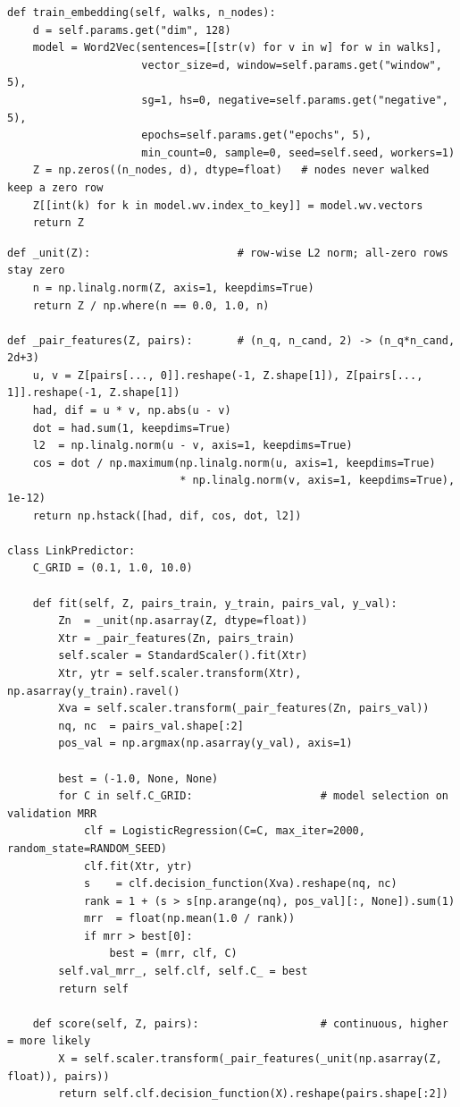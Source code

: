 \begin{lstlisting}[caption={TODO 2 --- \texttt{train\_embedding}},captionpos=b]
def train_embedding(self, walks, n_nodes):
    d = self.params.get("dim", 128)
    model = Word2Vec(sentences=[[str(v) for v in w] for w in walks],
                     vector_size=d, window=self.params.get("window", 5),
                     sg=1, hs=0, negative=self.params.get("negative", 5),
                     epochs=self.params.get("epochs", 5),
                     min_count=0, sample=0, seed=self.seed, workers=1)
    Z = np.zeros((n_nodes, d), dtype=float)   # nodes never walked keep a zero row
    Z[[int(k) for k in model.wv.index_to_key]] = model.wv.vectors
    return Z
\end{lstlisting}

\begin{lstlisting}[caption={TODO 3a --- \texttt{LinkPredictor} (and the pair feature map)},captionpos=b]
def _unit(Z):                       # row-wise L2 norm; all-zero rows stay zero
    n = np.linalg.norm(Z, axis=1, keepdims=True)
    return Z / np.where(n == 0.0, 1.0, n)

def _pair_features(Z, pairs):       # (n_q, n_cand, 2) -> (n_q*n_cand, 2d+3)
    u, v = Z[pairs[..., 0]].reshape(-1, Z.shape[1]), Z[pairs[..., 1]].reshape(-1, Z.shape[1])
    had, dif = u * v, np.abs(u - v)
    dot = had.sum(1, keepdims=True)
    l2  = np.linalg.norm(u - v, axis=1, keepdims=True)
    cos = dot / np.maximum(np.linalg.norm(u, axis=1, keepdims=True)
                           * np.linalg.norm(v, axis=1, keepdims=True), 1e-12)
    return np.hstack([had, dif, cos, dot, l2])

class LinkPredictor:
    C_GRID = (0.1, 1.0, 10.0)

    def fit(self, Z, pairs_train, y_train, pairs_val, y_val):
        Zn  = _unit(np.asarray(Z, dtype=float))
        Xtr = _pair_features(Zn, pairs_train)
        self.scaler = StandardScaler().fit(Xtr)
        Xtr, ytr = self.scaler.transform(Xtr), np.asarray(y_train).ravel()
        Xva = self.scaler.transform(_pair_features(Zn, pairs_val))
        nq, nc  = pairs_val.shape[:2]
        pos_val = np.argmax(np.asarray(y_val), axis=1)

        best = (-1.0, None, None)
        for C in self.C_GRID:                    # model selection on validation MRR
            clf = LogisticRegression(C=C, max_iter=2000, random_state=RANDOM_SEED)
            clf.fit(Xtr, ytr)
            s    = clf.decision_function(Xva).reshape(nq, nc)
            rank = 1 + (s > s[np.arange(nq), pos_val][:, None]).sum(1)
            mrr  = float(np.mean(1.0 / rank))
            if mrr > best[0]:
                best = (mrr, clf, C)
        self.val_mrr_, self.clf, self.C_ = best
        return self

    def score(self, Z, pairs):                   # continuous, higher = more likely
        X = self.scaler.transform(_pair_features(_unit(np.asarray(Z, float)), pairs))
        return self.clf.decision_function(X).reshape(pairs.shape[:2])
\end{lstlisting}

